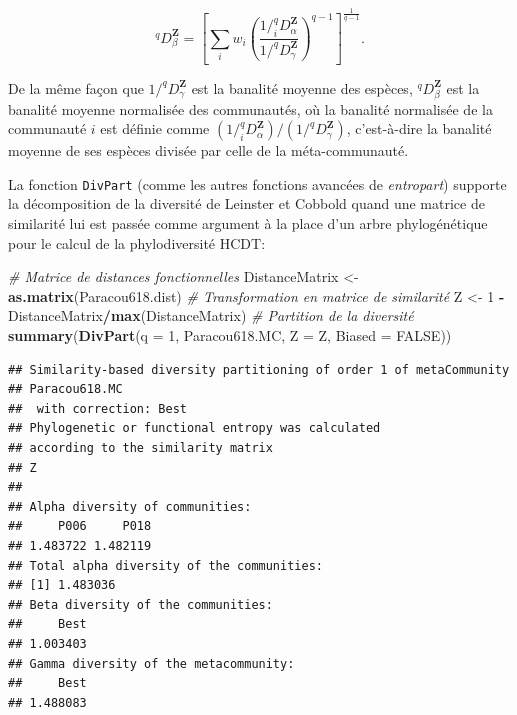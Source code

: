 \documentclass[
  11pt,
  french,
  a4paper,
  extrafontsizes,onecolumn,openright
  ]{memoir}
\newenvironment{Shaded}{\begin{snugshade}}{\end{snugshade}}
\newcommand{\CommentTok}[1]{\textcolor[rgb]{0.56,0.35,0.01}{\textit{#1}}}
\newcommand{\DataTypeTok}[1]{\textcolor[rgb]{0.13,0.29,0.53}{#1}}
\newcommand{\DecValTok}[1]{\textcolor[rgb]{0.00,0.00,0.81}{#1}}
\newcommand{\KeywordTok}[1]{\textcolor[rgb]{0.13,0.29,0.53}{\textbf{#1}}}
\newcommand{\NormalTok}[1]{#1}
\newcommand{\OperatorTok}[1]{\textcolor[rgb]{0.81,0.36,0.00}{\textbf{#1}}}
\newcommand{\OtherTok}[1]{\textcolor[rgb]{0.56,0.35,0.01}{#1}}
\newcommand{\StringTok}[1]{\textcolor[rgb]{0.31,0.60,0.02}{#1}}
\begin{document}
\begin{equation}
  \label{eq:Dbeta}
  ^q\!D^{\mathbf{Z}}_\beta
  ={\left[\sum_i{w_i}{\left(\frac{1/^q_i\!D^{\mathbf{Z}}_\alpha}{1/^q\!D^{\mathbf{Z}}_\gamma}\right)}^{q-1}\right]}^{\frac{1}{q-1}}.
\end{equation}

De la même façon que \(1/^q\!D^{\mathbf{Z}}_\gamma\) est la banalité moyenne des espèces, \(^q\!D^{\mathbf{Z}}_\beta\) est la banalité moyenne normalisée des communautés, où la banalité normalisée de la communauté \(i\) est définie comme \({\left(1/^q_i\!D^{\mathbf{Z}}_\alpha\right)}/{\left(1/^q\!D^{\mathbf{Z}}_\gamma\right)}\), c'est-à-dire la banalité moyenne de ses espèces divisée par celle de la méta-communauté.

La fonction \texttt{DivPart} (comme les autres fonctions avancées de \emph{entropart}) supporte la décomposition de la diversité de Leinster et Cobbold quand une matrice de similarité lui est passée comme argument à la place d'un arbre phylogénétique pour le calcul de la phylodiversité HCDT:

\scriptsize

\begin{Shaded}
\begin{Highlighting}[]
\CommentTok{# Matrice de distances fonctionnelles}
\NormalTok{DistanceMatrix <-}\StringTok{ }\KeywordTok{as.matrix}\NormalTok{(Paracou618.dist)}
\CommentTok{# Transformation en matrice de similarité}
\NormalTok{Z <-}\StringTok{ }\DecValTok{1} \OperatorTok{-}\StringTok{ }\NormalTok{DistanceMatrix}\OperatorTok{/}\KeywordTok{max}\NormalTok{(DistanceMatrix)}
\CommentTok{# Partition de la diversité}
\KeywordTok{summary}\NormalTok{(}\KeywordTok{DivPart}\NormalTok{(}\DataTypeTok{q =} \DecValTok{1}\NormalTok{, Paracou618.MC, }\DataTypeTok{Z =}\NormalTok{ Z, }\DataTypeTok{Biased =} \OtherTok{FALSE}\NormalTok{))}
\end{Highlighting}
\end{Shaded}

\begin{verbatim}
## Similarity-based diversity partitioning of order 1 of metaCommunity 
## Paracou618.MC
##  with correction: Best
## Phylogenetic or functional entropy was calculated
## according to the similarity matrix 
## Z 
## 
## Alpha diversity of communities: 
##     P006     P018 
## 1.483722 1.482119 
## Total alpha diversity of the communities: 
## [1] 1.483036
## Beta diversity of the communities: 
##     Best 
## 1.003403 
## Gamma diversity of the metacommunity: 
##     Best 
## 1.488083
\end{verbatim}
\end{document}
